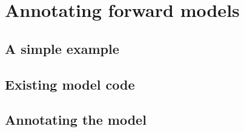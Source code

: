 \chapter{Annotating forward models}

\begin{synopsis}
\end{synopsis}
\minitoc
\vspace{\fill}
\newpage

\section{A simple example}
\section{Existing model code}
\section{Annotating the model}
